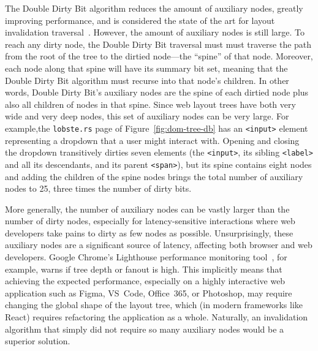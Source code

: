 The Double Dirty Bit algorithm
  reduces the amount of auxiliary nodes,
  greatly improving performance,
  and is considered the state of the art
  for layout invalidation traversal~\cite{tali-garseil,wbe}.
However, the amount of auxiliary nodes is still large.
To reach any dirty node,
  the Double Dirty Bit traversal must
  must traverse the path from the root of the tree
  to the dirtied node---the ``spine'' of that node.
Moreover, each node along that spine
  will have its summary bit set,
  meaning that the Double Dirty Bit algorithm
  must recurse into that node's children.
In other words,
  Double Dirty Bit's auxiliary nodes
  are the spine of each dirtied node
  plus also all children of nodes in that spine.
Since web layout trees have both very wide and very deep nodes,
  this set of auxiliary nodes can be very large.
For example,the \texttt{lobste.rs} page of Figure~\ref{fig:dom-tree-db}
  has an \texttt{<input>} element representing
  a dropdown that a user might interact with.
Opening and closing the dropdown transitively dirties seven elements
  (the \texttt{<input>},
    its sibling \texttt{<label>} and all its descendants,
    and its parent \texttt{<span>}),
  but its spine contains eight nodes
  and adding the children of the spine nodes
  brings the total number of auxiliary nodes to 25,
  three times the number of dirty bits.

More generally, the number of auxiliary nodes
  can be vastly larger than the number of dirty nodes,
  especially for latency-sensitive interactions
  where web developers take pains to dirty
  as few nodes as possible.
Unsurprisingly, these auxiliary nodes
  are a significant source of latency,
  affecting both browser and web developers.
Google Chrome's Lighthouse performance monitoring tool~\cite{lighthouse},
  for example, warns if tree depth or fanout is high.
This implicitly means that achieving the expected performance,
  especially on a highly interactive web application
  such as Figma, VS~Code, Office~365, or Photoshop,
  may require changing the global shape of the layout tree,
  which (in modern frameworks like React)
  requires refactoring the application as a whole.
Naturally, an invalidation algorithm that simply
  did not require so many auxiliary nodes
  would be a superior solution.

